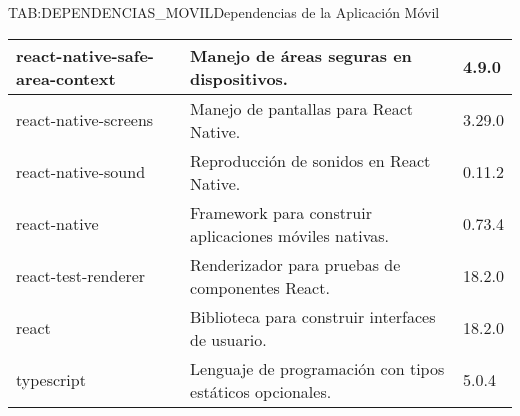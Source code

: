 \begin{table}[Dependencias de la Aplicación Móvil]{TAB:DEPENDENCIAS_MOVIL}{Dependencias de la Aplicación Móvil}
\begin{tabular}{|p{6cm}|p{8cm}|p{2cm}|}
    \hline
    react-native-safe-area-context & Manejo de áreas seguras en dispositivos. & 4.9.0 \\
    \hline
    react-native-screens & Manejo de pantallas para React Native. & 3.29.0 \\
    \hline
    react-native-sound & Reproducción de sonidos en React Native. & 0.11.2 \\
    \hline
    react-native & Framework para construir aplicaciones móviles nativas. & 0.73.4 \\
    \hline
    react-test-renderer & Renderizador para pruebas de componentes React. & 18.2.0 \\
    \hline
    react & Biblioteca para construir interfaces de usuario. & 18.2.0 \\
    \hline
    typescript & Lenguaje de programación con tipos estáticos opcionales. & 5.0.4 \\
    \hline
  \end{tabular}
\end{table}